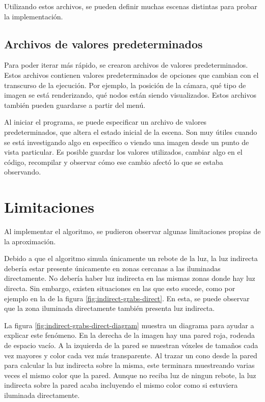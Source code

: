 Utilizando estos archivos, se pueden definir muchas escenas distintas para probar la implementación.

\subsection{Archivos de valores predeterminados}

Para poder iterar más rápido, se crearon archivos de valores predeterminados.
Estos archivos contienen valores predeterminados de opciones que cambian con el transcurso de la ejecución.
Por ejemplo, la posición de la cámara, qué tipo de imagen se está renderizando, qué nodos están siendo visualizados.
Estos archivos también pueden guardarse a partir del menú.

Al iniciar el programa, se puede especificar un archivo de valores predeterminados, que altera el estado inicial de la escena.
Son muy útiles cuando se está investigando algo en específico o viendo una imagen desde un punto de vista particular.
Es posible guardar los valores utilizados, cambiar algo en el código, recompilar y observar cómo ese cambio afectó lo que se estaba observando.

\section{Limitaciones}

Al implementar el algoritmo, se pudieron observar algunas limitaciones propias de la aproximación.

Debido a que el algoritmo simula únicamente un rebote de la luz, la luz indirecta debería estar presente únicamente en zonas cercanas a las iluminadas directamente.
No debería haber luz indirecta en las mismas zonas donde hay luz directa.
Sin embargo, existen situaciones en las que esto sucede, como por ejemplo en la de la figura \ref{fig:indirect-grabs-direct}.
En esta, se puede observar que la zona iluminada directamente también presenta luz indirecta.

La figura \ref{fig:indirect-grabs-direct-diagram} muestra un diagrama para ayudar a explicar este fenómeno.
En la derecha de la imagen hay una pared roja, rodeada de espacio vacío.
A la izquierda de la pared se muestran vóxeles de tamaños cada vez mayores y color cada vez más transparente.
Al trazar un cono desde la pared para calcular la luz indirecta sobre la misma, este terminara muestreando varias veces el mismo color que la pared.
Aunque no reciba luz de ningun rebote, la luz indirecta sobre la pared acaba incluyendo el mismo color como si estuviera iluminada directamente.

